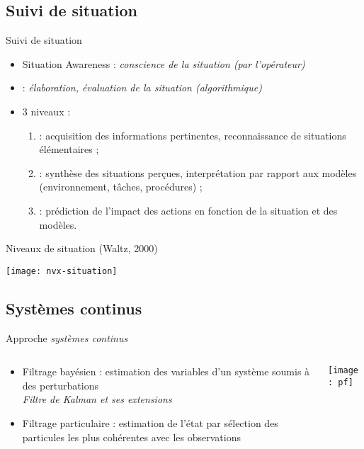 \documentclass[compress]{beamer}
\begin{document}
\subsection{Suivi de situation}
\begin{frame}{Suivi de situation}
\begin{itemize}
\item Situation Awareness : {\it conscience de la situation (par l'opérateur)}
\item {} : {\it élaboration, évaluation de la situation (algorithmique)}
\item 3 niveaux :
	\begin{enumerate}
	\item {} : acquisition des informations pertinentes,
		reconnaissance de situations élémentaires ;
	\item {} : synthèse des situations perçues, 
		interprétation par rapport aux modèles (environnement, tâches, procédures) ;
	\item {} : prédiction de l'impact des actions
		 en fonction de la situation	 et des modèles.
	\end{enumerate}
\end{itemize}
\end{frame}

\begin{frame}{Niveaux de situation (Waltz, 2000)}
\begin{center}
\texttt{[image: nvx-situation]}
\end{center}
\end{frame}

\subsection{Systèmes continus}
\begin{frame}{Approche \it systèmes continus}
\begin{columns}
\begin{column}{.65\linewidth}
	\begin{itemize}
	\item Filtrage bayésien : estimation des variables d'un système soumis à des perturbations\\
		{\it Filtre de Kalman et ses extensions}
	\item Filtrage particulaire : estimation de l'état par sélection des particules les plus cohérentes 
		avec les observations
	\end{itemize}
\end{column}
\begin{column}{.3\linewidth}
	\texttt{[image: pf]}
\end{column}
\end{columns}
\end{frame}
\end{document}
